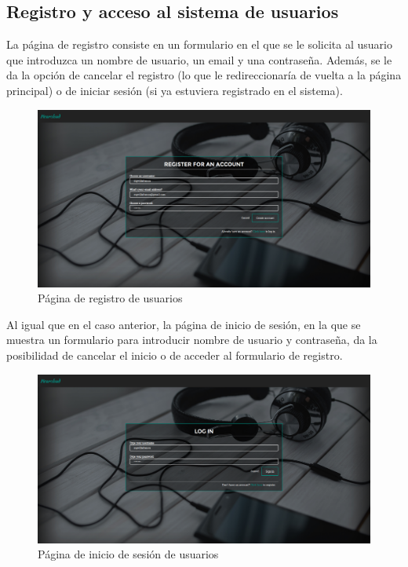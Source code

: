 \subsection{Registro y acceso al sistema de usuarios}

La página de registro consiste en un formulario en el que se le solicita al usuario que introduzca un nombre de usuario, un email y una contraseña. Además, se le da la opción de cancelar el registro (lo que le redireccionaría de vuelta a la página principal) o de iniciar sesión (si ya estuviera registrado en el sistema).

\begin{figure}[H] 
\centering 
\includegraphics[scale=0.2]{../images/um/um_2.png}
\caption{Página de registro de usuarios}
\end{figure}

Al igual que en el caso anterior, la página de inicio de sesión, en la que se muestra un formulario para introducir nombre de usuario y contraseña, da la posibilidad de cancelar el inicio o de acceder al formulario de registro.

\begin{figure}[H] 
\centering 
\includegraphics[scale=0.2]{../images/um/um_3.png}
\caption{Página de inicio de sesión de usuarios}
\end{figure}

